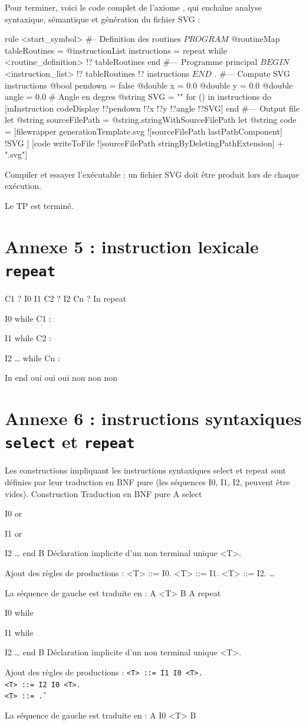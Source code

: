 Pour terminer, voici le code complet de l’axiome , qui enchaîne analyse syntaxique, sémantique et génération du fichier SVG :
\begin{galgascode}
rule <start_symbol> {
#-- Definition des routines
  $PROGRAM$
  @routineMap tableRoutines = {}
  @instructionList instructions = {}
  repeat
  while
    <routine_definition> !? tableRoutines
  end
#--- Programme principal
  $BEGIN$
  <instruction_list> !? tableRoutines !? instructions
  $END$
  $.$
#--- Compute SVG instructions
  @bool pendown = false
  @double x = 0.0
  @double y = 0.0
  @double angle = 0.0 # Angle en degres
  @string SVG = ""
  for () in instructions do
    [mInstruction codeDisplay !?pendown !?x !?y !?angle !?SVG]
  end
#--- Output file
  let @string sourceFilePath = @string.stringWithSourceFilePath
  let @string code = [filewrapper generationTemplate.svg
    ![sourceFilePath lastPathComponent]
    !SVG
  ]
  [code writeToFile ![sourceFilePath stringByDeletingPathExtension] + ".svg"]
}
\end{galgascode}

Compiler et essayer l'exécutable : un fichier SVG doit être produit lors de chaque exécution.

Le TP est terminé.



\section {Annexe 5 : instruction lexicale \texttt{repeat}}
C1 ?
I0
I1
C2 ?
I2
Cn ?
In
repeat

I0
while C1 :

I1
while C2 :

I2
…
while Cn :

In
end
oui
oui
oui
non
non
non

\section{Annexe 6 : instructions syntaxiques \texttt{select} et \texttt{repeat}}

Les constructions impliquant les instructions syntaxiques select et repeat sont définies par leur traduction en BNF pure (les séquences I0, I1, I2, peuvent être vides).
Construction	Traduction en BNF pure
A
select

I0
or

I1
or

I2
…
end
B	Déclaration implicite d'un non terminal unique <T>.

Ajout des règles de productions :
<T> ::= I0.
<T> ::= I1.
<T> ::= I2.
…

La séquence de gauche est traduite en : A <T> B
A
repeat

I0
while

I1
while

I2
…
end
B	Déclaration implicite d'un non terminal unique <T>.

Ajout des règles de productions :
\texttt{<T> ::= I1 I0 <T>.\\<T> ::= I2 I0 <T>.\\<T> ::= \^.}

La séquence de gauche est traduite en : A I0 <T> B
